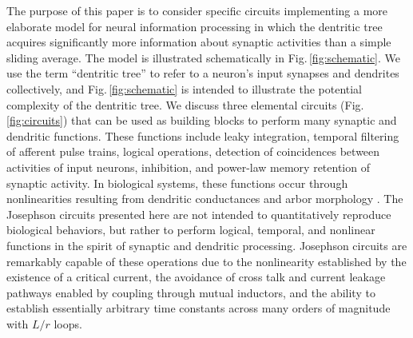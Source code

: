 \documentclass[twocolumn]{article}
\begin{document}
\begin{figure}[tb]
\end{figure}
The purpose of this paper is to consider specific circuits implementing a more elaborate model for neural information processing in which the dentritic tree acquires significantly more information about synaptic activities than a simple sliding average. The model is illustrated schematically in Fig.\,\ref{fig:schematic}. We use the term ``dentritic tree'' to refer to a neuron's input synapses and dendrites collectively, and Fig.\,\ref{fig:schematic} is intended to illustrate the potential complexity of the dentritic tree. We discuss three elemental circuits (Fig.\,\ref{fig:circuits}) that can be used as building blocks to perform many synaptic and dendritic functions. These functions include leaky integration, temporal filtering of afferent pulse trains, logical operations, detection of coincidences between activities of input neurons, inhibition, and power-law memory retention of synaptic activity. In biological systems, these functions occur through nonlinearities resulting from dendritic conductances and arbor morphology \cite{stse2007,stsp2015}. The Josephson circuits presented here are not intended to quantitatively reproduce biological behaviors, but rather to perform logical, temporal, and nonlinear functions in the spirit of synaptic and dendritic processing. Josephson circuits are remarkably capable of these operations due to the nonlinearity established by the existence of a critical current, the avoidance of cross talk and current leakage pathways enabled by coupling through mutual inductors, and the ability to establish essentially arbitrary time constants across many orders of magnitude with $L/r$ loops. 
\end{document}
